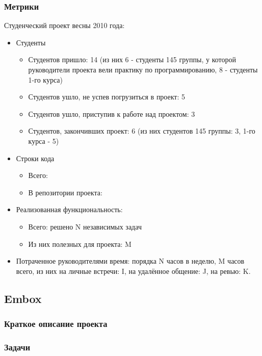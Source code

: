\documentclass[a5paper]{article}
\begin{document}
\subsubsection{Метрики}
Студенческий проект весны 2010 года:
\begin{itemize}
	\item Студенты
		\begin{itemize}
			\item Студентов пришло: 14 (из них 6 - студенты 145 группы, у которой руководители проекта вели практику по программированию, 8 - студенты 1-го курса)
			\item Студентов ушло, не успев погрузиться в проект: 5
			\item Студентов ушло, приступив к работе над проектом: 3
			\item Студентов, закончивших проект: 6 (из них студентов 145 группы: 3, 1-го курса - 5)
		\end{itemize}
	\item Строки кода
		\begin{itemize}
			\item Всего:
			\item В репозитории проекта:
		\end{itemize}
	\item Реализованная функциональность:
		\begin{itemize}
			\item Всего: решено N независимых задач 
			\item Из них полезных для проекта: M
		\end{itemize}
	\item Потраченное руководителями время: порядка N часов в неделю, M часов всего, из них на личные встречи: I, на удалённое общение: J, на ревью: K.
\end{itemize}




\subsection{Embox}

\subsubsection{Краткое описание проекта}

\subsubsection{Задачи}
\end{document}
